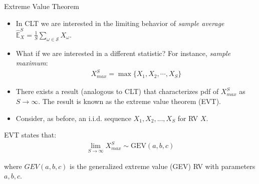 \documentclass[handout,9pt]{beamer}
\begin{document}
%
\begin{frame}{Extreme Value Theorem}

\begin{itemize}
\setlength{\itemsep}{10pt}
\item In CLT we are interested in the limiting behavior of {\em sample average} $\hat{\mathbb{E}}_X^S=\frac{1}{S}\sum_{\omega\in \mathcal{S}}X_\omega$. 

\item What if we are interested in a different statistic? For instance, {\em sample maximum}:
\begin{align*}
X_{max}^S=\max\{X_1,X_2,\cdots, X_S\}
\end{align*}

\item There exists a result (analogous to CLT) that characterizes pdf of $X_{max}^S$ as $S\to \infty$.  The result is known as the extreme value theorem (EVT).

\item Consider, as before, an i.i.d. sequence $X_1,X_2,...,X_S$ for RV $X$. 

\end{itemize}

\begin{block}{}
EVT states that:
\begin{align*}
\lim_{S\to \infty}X_{max}^S\sim \textrm{GEV}(a,b,c)
\end{align*}
\end{block}
where $GEV(a,b,c)$ is the generalized extreme value (GEV) RV with parameters $a,b,c$. 

\end{frame}
\end{document}
